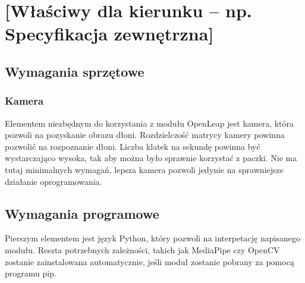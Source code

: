 

\chapter{[Właściwy dla kierunku -- np. Specyfikacja zewnętrzna]}

\section{Wymagania sprzętowe}
\subsection{Kamera}
\quad Elementem niezbędnym do korzystania z modułu OpenLeap jest kamera, która pozwoli na pozyskanie obrazu dłoni. Rozdzielczość matrycy kamery powinna pozwolić na rozpoznanie dłoni. Liczba klatek na sekundę powinna być wystarczająco wysoka, tak aby można było sprawnie korzystać z paczki. Nie ma tutaj minimalnych wymagań, lepsza kamera pozwoli jedynie na sprawniejsze działanie oprogramowania. 

\section{Wymagania programowe}
\quad Pierszym elementem jest język Python, który pozwoli na interpetację napisanego modułu. Reszta potrzebnych zależności, takich jak MediaPipe czy OpenCV zostanie zainstalowana automatycznie, jeśli moduł zostanie pobrany za pomocą programu pip. 

